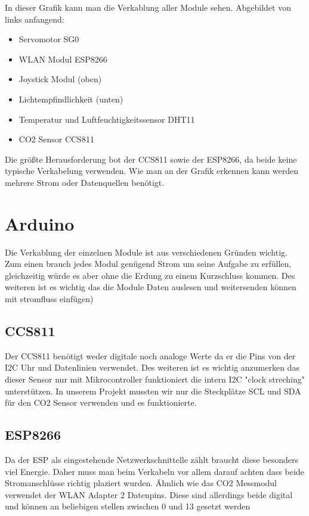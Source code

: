 In dieser Grafik kann man die Verkablung aller Module sehen. Abgebildet von links anfangend:

\begin{itemize}
	\item Servomotor SG0
	\item WLAN Modul ESP8266
	\item Joystick Modul (oben)
	\item Lichtempfindlichkeit (unten)
	\item Temperatur und Luftfeuchtigkeitssensor DHT11
	\item CO2 Sensor CCS811
\end{itemize}

Die größte Herausforderung bot der CCS811 sowie der ESP8266, da beide keine typische Verkabelung verwenden. Wie man an der Grafik erkennen kann werden mehrere Strom oder Datenquellen benötigt.



\section{Arduino}
Die Verkablung der einzelnen Module ist aus verschiedenen Gründen wichtig. Zum einen brauch jedes Modul genügend Strom um seine Aufgabe zu erfüllen, gleichzeitig würde es aber ohne die Erdung zu einem Kurzschluss kommen. Des weiteren ist es wichtig das die Module Daten auslesen und weitersenden können
 mit stromfluss einfügen)
 
 \subsection{CCS811}

Der CCS811 benötigt weder digitale noch analoge Werte da er die Pins von der I2C Uhr und Datenlinien verwendet. Des weiteren ist es wichtig anzumerken das dieser Sensor nur mit Mikrocontroller funktioniert die intern I2C "clock streching" unterstützen. In unserem Projekt mussten wir nur die Steckplätze SCL und SDA für den CO2 Sensor verwenden und es funktionierte.

\subsection{ESP8266}

Da der ESP als eingestehende Netzwerkschnittelle zählt braucht diese besonders viel Energie. Daher muss man beim Verkabeln vor allem darauf achten dass beide Stromanschlüsse richtig plaziert wurden. Ähnlich wie das CO2 Messmodul verwendet der WLAN Adapter 2 Datenpins. Diese sind allerdings beide digital und können an beliebigen stellen zwischen 0 und 13 gesetzt werden

